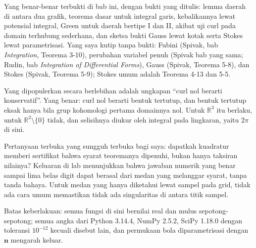 \begin{untukpeneliti}
Yang benar-benar terbukti di bab ini, dengan bukti yang ditulis: lemma daerah
di antara dua grafik, teorema dasar untuk integral garis, kebalikannya lewat
potensial integral, Green untuk daerah bertipe I dan II, akibat uji curl pada
domain terhubung sederhana, dan sketsa bukti Gauss lewat kotak serta Stokes
lewat parametrisasi. Yang saya kutip tanpa bukti: Fubini (Spivak, bab
\emph{Integration}, Teorema 3-10), perubahan variabel penuh (Spivak bab yang
sama; Rudin, bab \emph{Integration of Differential Forms}), Gauss (Spivak,
Teorema 5-8), dan Stokes (Spivak, Teorema 5-9); Stokes umum adalah Teorema
4-13 dan 5-5.

Yang dipopulerkan secara berlebihan adalah ungkapan ``curl nol berarti
konservatif''. Yang benar: curl nol berarti bentuk tertutup, dan bentuk tertutup
eksak hanya bila grup kohomologi pertama domainnya nol. Untuk $\mathbb{R}^{3}$
itu berlaku, untuk $\mathbb{R}^{2}\setminus\{0\}$ tidak, dan selisihnya
diukur oleh integral pada lingkaran, yaitu $2\pi$ di sini.

Pertanyaan terbuka yang sungguh terbuka bagi saya: dapatkah kuadratur memberi
sertifikat bahwa syarat teoremanya dipenuhi, bukan hanya taksiran nilainya?
Keluaran di lab menunjukkan bahwa jawaban numerik yang benar sampai lima belas
digit dapat berasal dari medan yang melanggar syarat, tanpa tanda bahaya. Untuk
medan yang hanya diketahui lewat sampel pada grid, tidak ada cara umum
memastikan tidak ada singularitas di antara titik sampel.

Batas keberlakuan: semua fungsi di sini bernilai real dan mulus
sepotong-sepotong; semua angka dari Python 3.14.4, NumPy 2.5.2, SciPy 1.18.0
dengan toleransi $10^{-12}$ kecuali disebut lain, dan permukaan bola
diparametrisasi dengan $\mathbf{n}$ mengarah keluar.
\end{untukpeneliti}

